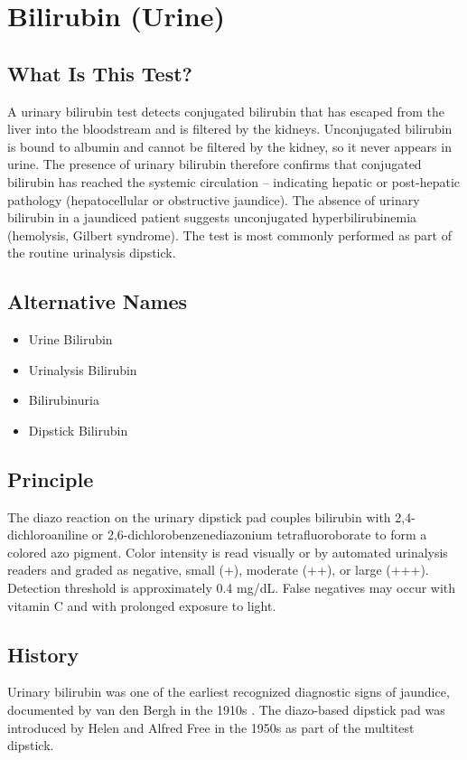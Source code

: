 \chapter{Bilirubin (Urine)}

\section*{What Is This Test?}
A urinary bilirubin test detects conjugated bilirubin that has escaped from the liver into the bloodstream and is filtered by the kidneys. Unconjugated bilirubin is bound to albumin and cannot be filtered by the kidney, so it never appears in urine. The presence of urinary bilirubin therefore confirms that conjugated bilirubin has reached the systemic circulation -- indicating hepatic or post-hepatic pathology (hepatocellular or obstructive jaundice). The absence of urinary bilirubin in a jaundiced patient suggests unconjugated hyperbilirubinemia (hemolysis, Gilbert syndrome). The test is most commonly performed as part of the routine urinalysis dipstick.

\section*{Alternative Names}
\begin{itemize}
  \item Urine Bilirubin
  \item Urinalysis Bilirubin
  \item Bilirubinuria
  \item Dipstick Bilirubin
\end{itemize}
\section*{Principle}
The diazo reaction on the urinary dipstick pad couples bilirubin with 2,4-dichloroaniline or 2,6-dichlorobenzenediazonium tetrafluoroborate to form a colored azo pigment. Color intensity is read visually or by automated urinalysis readers and graded as negative, small (+), moderate (++), or large (+++). Detection threshold is approximately 0.4 mg/dL. False negatives may occur with vitamin C and with prolonged exposure to light.

\section*{History}
Urinary bilirubin was one of the earliest recognized diagnostic signs of jaundice, documented by van den Bergh in the 1910s \cite{vandenbergh1916uber}. The diazo-based dipstick pad was introduced by Helen and Alfred Free in the 1950s as part of the multitest dipstick.

